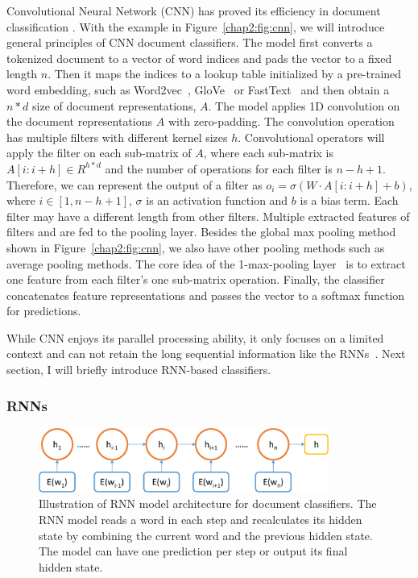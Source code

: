 Convolutional Neural Network (CNN) has proved its efficiency in document classification \cite{kim2014convolutional}. 
With the example in Figure~\ref{chap2:fig:cnn}, we will introduce general principles of CNN document classifiers.
The model first converts a tokenized document to a vector of word indices and pads the vector to a fixed length $n$. 
Then it maps the indices to a lookup table initialized by a pre-trained word embedding, such as Word2vec~\cite{mikolov2013distributed}, GloVe~\cite{pennington2014glove} or FastText~\cite{bojanowski2017enriching} and then obtain a $n*d$ size of document representations, $A$.
The model applies 1D convolution on the document representations $A$ with zero-padding.
The convolution operation has multiple filters with different kernel sizes $h$.
Convolutional operators will apply the filter on each sub-matrix of $A$, where each sub-matrix is $A[i: i+h] \in R^{h*d}$ and the number of operations for each filter is $n-h+1$.
Therefore, we can represent the output of a filter as $o_i = \sigma(W \cdot A[i:i+h] + b)$, where $i \in [1, n-h+1]$, $\sigma$ is an activation function and $b$ is a bias term.
Each filter may have a different length from other filters.
Multiple extracted features of filters and are fed to the pooling layer.
Besides the global max pooling method shown in Figure~\ref{chap2:fig:cnn}, we also have other pooling methods such as average pooling methods.
The core idea of the 1-max-pooling layer~\cite{kim2014convolutional} is to extract one feature from each filter's one sub-matrix operation. 
Finally, the classifier concatenates feature representations and passes the vector to a softmax function for predictions.

While CNN enjoys its parallel processing ability, it only focuses on a limited context and can not retain the long sequential information like the RNNs~\cite{goodfellow2016deep}. Next section, I will briefly introduce RNN-based classifiers.


\subsubsection{RNNs}

\begin{figure}[htp]
\centering
\includegraphics[width=0.85\textwidth]{images/chapter2/rnn.pdf}
\caption{Illustration of RNN model architecture for document classifiers. The RNN model reads a word in each step and recalculates its hidden state by combining the current word and the previous hidden state. The model can have one prediction per step or output its final hidden state.}
\label{chap2:fig:rnn}
\end{figure}


